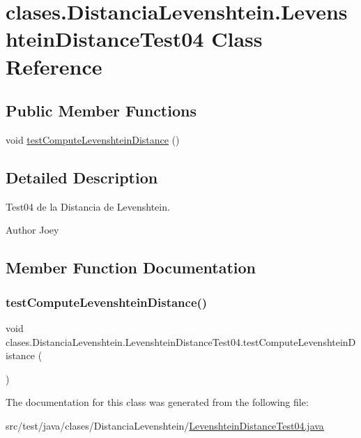 \hypertarget{classclases_1_1_distancia_levenshtein_1_1_levenshtein_distance_test04}{}\section{clases.\+Distancia\+Levenshtein.\+Levenshtein\+Distance\+Test04 Class Reference}
\label{classclases_1_1_distancia_levenshtein_1_1_levenshtein_distance_test04}
\subsection*{Public Member Functions}
\begin{DoxyCompactItemize}
\item 
void \hyperlink{classclases_1_1_distancia_levenshtein_1_1_levenshtein_distance_test04_a066861d7e72c8c5912e032286e892f67}{test\+Compute\+Levenshtein\+Distance} ()
\end{DoxyCompactItemize}


\subsection{Detailed Description}
Test04 de la Distancia de Levenshtein. \begin{DoxyAuthor}{Author}
Joey 
\end{DoxyAuthor}


\subsection{Member Function Documentation}
\hypertarget{classclases_1_1_distancia_levenshtein_1_1_levenshtein_distance_test04_a066861d7e72c8c5912e032286e892f67}{}\label{classclases_1_1_distancia_levenshtein_1_1_levenshtein_distance_test04_a066861d7e72c8c5912e032286e892f67} 
\subsubsection{\texorpdfstring{test\+Compute\+Levenshtein\+Distance()}{testComputeLevenshteinDistance()}}
{\footnotesize\ttfamily void clases.\+Distancia\+Levenshtein.\+Levenshtein\+Distance\+Test04.\+test\+Compute\+Levenshtein\+Distance (\begin{DoxyParamCaption}{ }\end{DoxyParamCaption})}



The documentation for this class was generated from the following file\+:\begin{DoxyCompactItemize}
\item 
src/test/java/clases/\+Distancia\+Levenshtein/\hyperlink{_levenshtein_distance_test04_8java}{Levenshtein\+Distance\+Test04.\+java}\end{DoxyCompactItemize}
